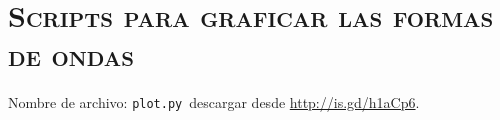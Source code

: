 \chapter{\textsc{Scripts para graficar las formas de ondas}}\label{chap:matplotlib}
\noindnt Nombre de archivo: \verb_plot.py_\, descargar desde \url{http://is.gd/h1aCp6}.

